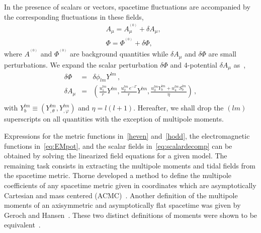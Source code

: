 \documentclass[aps,twocolumn,showpacs,preprintnumbers,nofootinbib,prd,superscriptaddress,groupedaddress,10pt]{revtex4-1}
\def\nn{\nonumber}
\begin{document}
In the presence of scalars or vectors, spacetime fluctuations are accompanied by the corresponding fluctuations in these fields,
%
\begin{align}
\label{4pot}
&A_\mu=A^{^{(0)}}_\mu+\delta A_\mu,\\
\label{scalarfield}
&\Phi=\Phi^{^{(0)}}+\delta\Phi,
\end{align}
%
where $A^{^{(0)}}$ and $\Phi^{^{(0)}}$ are background quantities while $\delta A_\mu$ and $\delta\Phi$ are small perturbations. We expand the scalar perturbation $\delta\Phi$ and $4$-potential $\delta A_{\mu}$ as~\cite{Rosa:2011my,Pani:2013wsa},
%
\begin{eqnarray}
\delta\Phi &=&\delta\phi_{lm}Y^{lm}\,,\label{eq:scalardecomp}\\
\delta A_{\mu}&=&\left(\frac{u_1^{lm}}{r} Y^{lm},\frac{u_2^{lm}\,e^{-\Gamma}}{r} Y^{lm} ,\frac{u_3^{lm} Y_{b}^{lm}+u_4^{lm} S_{b}^{lm}}{{\eta}}\right)\,,\nn\\\label{eq:EMpot}
\end{eqnarray}
%
with \mbox{$Y_{b}^{lm}\equiv\left(Y_{,\theta}^{lm},Y_{,\varphi}^{lm}\right)$} and ${\eta}=l(l+1)$.
Hereafter, we shall drop the $(lm)$ superscripts on all quantities with the exception of multipole moments.

Expressions for the metric functions in~\eqref{heven} and~\eqref{hodd}, the electromagnetic functions in~\eqref{eq:EMpot}, and the scalar fields in~\eqref{eq:scalardecomp} can be obtained by solving the linearized field equations for a given model. The remaining task consists in extracting the multipole moments and tidal fields from the spacetime metric. Thorne developed a method to define the multipole coefficients of any spacetime metric given in coordinates which are asymptotically Cartesian and mass centered (ACMC)~\cite{Thorne:1980ru}. Another definition of the multipole moments of an axisymmetric and asymptotically flat spacetime was given by Geroch and Hansen~\cite{Geroch:1970cd,Hansen:1974zz}. These two distinct definitions of moments were shown to be equivalent~\cite{Gursel:1983}. 
\end{document}
